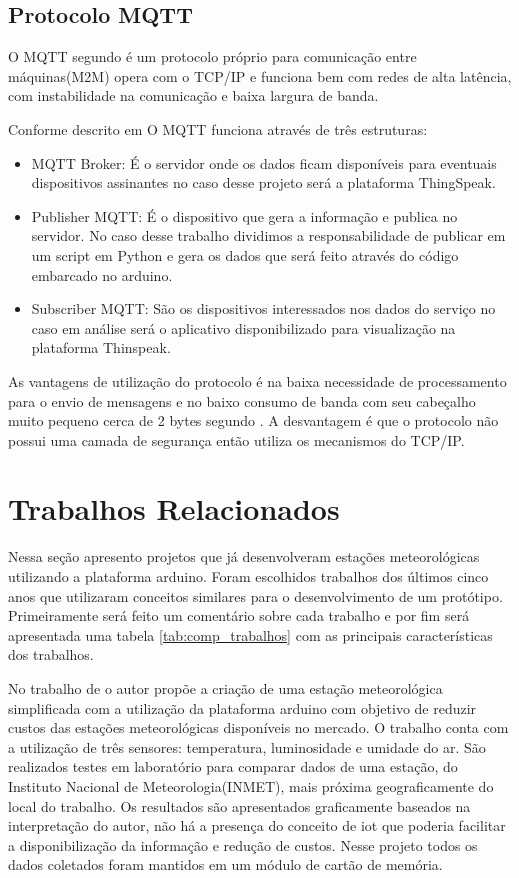 \subsection{Protocolo MQTT}

O MQTT segundo \cite{torres2016analise} é um protocolo próprio para comunicação entre máquinas(M2M) opera com o TCP/IP e funciona bem com redes de alta latência, com instabilidade na comunicação e baixa largura de banda.

Conforme descrito em \cite{de2017internet} O MQTT funciona através de três estruturas:

\begin{itemize}
\item MQTT Broker: É o servidor onde os dados ficam disponíveis para eventuais dispositivos assinantes no caso desse projeto será a plataforma ThingSpeak.
\item Publisher MQTT: É o dispositivo que gera a informação e publica no servidor. No caso desse trabalho dividimos a responsabilidade de publicar em um script em Python e gera os dados que será feito através do código embarcado no arduino.
\item Subscriber MQTT: São os dispositivos interessados nos dados do serviço no caso em análise será o aplicativo disponibilizado para visualização na plataforma Thinspeak.
\end{itemize}

As vantagens de utilização do protocolo é na baixa necessidade de processamento para o envio de mensagens e no baixo consumo de banda com seu cabeçalho muito pequeno cerca de 2 bytes segundo \cite{mota2017analise}. A desvantagem é que o protocolo não possui uma camada de segurança então utiliza os mecanismos do TCP/IP.



\section{Trabalhos Relacionados}

Nessa seção apresento projetos que já desenvolveram estações meteorológicas utilizando a plataforma arduino. Foram escolhidos trabalhos dos últimos cinco anos que utilizaram conceitos similares para o desenvolvimento de um protótipo. Primeiramente será feito um comentário sobre cada trabalho e por fim será apresentada uma tabela \ref{tab:comp_trabalhos} com as principais características dos trabalhos.

No trabalho de \cite{torres2015aquisiccao} o autor propõe a criação de uma estação meteorológica simplificada com a utilização da plataforma arduino com objetivo de reduzir custos das estações meteorológicas disponíveis no mercado. O trabalho conta com a utilização de três sensores: temperatura, luminosidade e umidade do ar. São realizados testes em laboratório para comparar dados de uma estação, do Instituto Nacional de Meteorologia(INMET), mais próxima geograficamente do local do trabalho. Os resultados são apresentados graficamente baseados na interpretação do autor, não há a presença do conceito de iot que poderia facilitar a disponibilização da informação e redução de custos. Nesse projeto todos os dados coletados foram mantidos em um módulo de cartão de memória.

